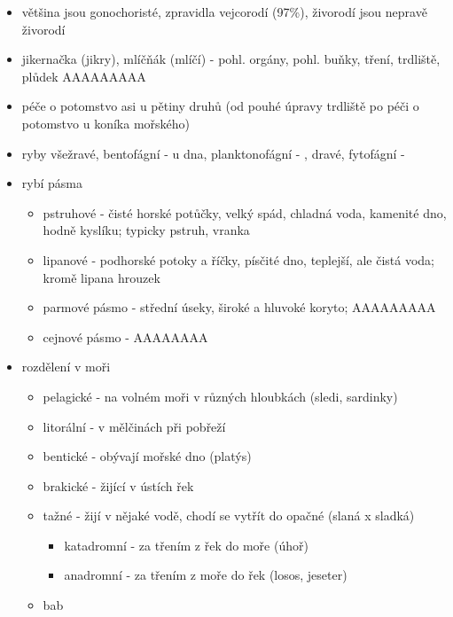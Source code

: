 \documentclass{article}
\begin{document}
\begin{itemize}
\begin{itemize}
  \end{itemize}
  \item většina jsou gonochoristé, zpravidla vejcorodí (97\%), živorodí jsou nepravě živorodí
  \item jikernačka (jikry), mlíčňák (mlíčí) - pohl. orgány, pohl. buňky, tření, trdliště, plůdek AAAAAAAAA
  \item péče o potomstvo asi u pětiny druhů (od pouhé úpravy trdliště po péči o potomstvo u koníka mořského)
  \item ryby všežravé, bentofágní - u dna, planktonofágní -  , dravé, fytofágní - 
  \item rybí pásma
  \begin{itemize}
    \item pstruhové - čisté horské potůčky, velký spád, chladná voda, kamenité dno, hodně kyslíku; typicky pstruh, vranka
    \item lipanové - podhorské potoky a říčky, písčité dno, teplejší, ale čistá voda; kromě lipana hrouzek
    \item parmové pásmo - střední úseky, široké a hluvoké koryto; AAAAAAAAA
    \item cejnové pásmo - AAAAAAAA
  \end{itemize}
  \item rozdělení v moři
  \begin{itemize}
    \item pelagické - na volném moři v různých hloubkách (sledi, sardinky)
    \item litorální - v mělčinách při pobřeží
    \item bentické - obývají mořské dno (platýs)
    \item brakické - žijící v ústích řek
    \item tažné - žijí v nějaké vodě, chodí se vytřít do opačné (slaná x sladká)
    \begin{itemize}
      \item katadromní - za třením z řek do moře (úhoř)
      \item anadromní - za třením z moře do řek (losos, jeseter)
    \end{itemize}
    \item bab
  \end{itemize}
\end{itemize}
\end{document}
